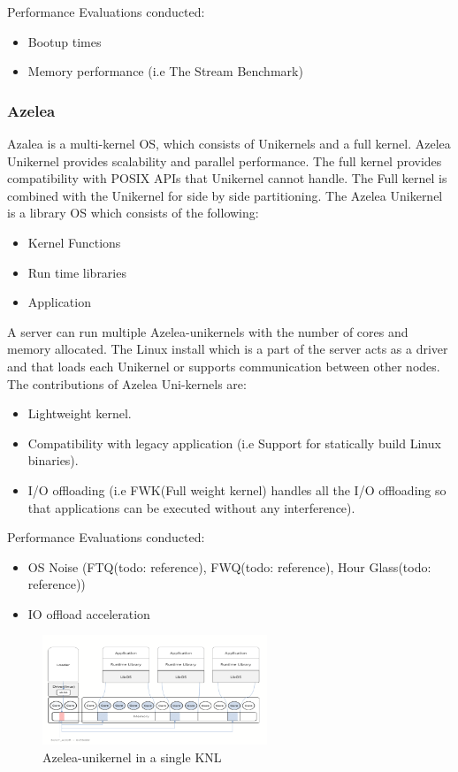Performance Evaluations conducted:
\begin{itemize}
  \item Bootup times 
  \item Memory performance (i.e The Stream Benchmark)
\end{itemize}

\subsubsection{Azelea} 
Azalea is a multi-kernel OS, which consists of Unikernels and a full kernel. Azelea Unikernel provides scalability and parallel performance. 
The full kernel provides compatibility with POSIX APIs that Unikernel cannot handle. The Full kernel is combined with the Unikernel for 
side by side partitioning. The Azelea Unikernel is a library OS which consists of the following: 
\begin{itemize}
  \item Kernel Functions 
  \item Run time libraries 
  \item Application 
\end{itemize}
A server can run multiple Azelea-unikernels with the number of cores and memory allocated. The Linux install which is a part of 
the server acts as a driver and that loads each Unikernel or supports communication between other nodes. 
The contributions of Azelea Uni-kernels are:
\begin{itemize}
  \item Lightweight kernel.
  \item Compatibility with legacy application (i.e Support for statically build Linux binaries).
  \item I/O offloading (i.e FWK(Full weight kernel) handles all the I/O offloading so that applications can be executed without any interference). 
\end{itemize}

Performance Evaluations conducted:
\begin{itemize}
  \item OS Noise (FTQ(todo: reference), FWQ(todo: reference), Hour Glass(todo: reference))
  \item IO offload acceleration 
\end{itemize}

\begin{figure}[htbp!] 
  \centering    
  \includegraphics[width=0.6\textwidth]{AzeleaKNL}
  \caption[Azelea]{Azelea-unikernel in a single KNL}
  \label{fig:AzeleaKNL}
  \end{figure}


